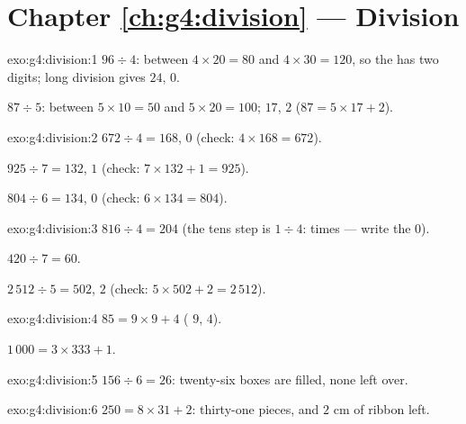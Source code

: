 \section*{Chapter \ref{ch:g4:division} --- Division}

\begin{solution}{exo:g4:division:1}
$96 \div 4$: between $4 \times 20 = 80$ and $4 \times 30 = 120$, so
the  has two digits; long division gives $24$, 
$0$.

$87 \div 5$: between $5 \times 10 = 50$ and $5 \times 20 = 100$;
 $17$,  $2$ ($87 = 5 \times 17 + 2$).
\end{solution}

\begin{solution}{exo:g4:division:2}
$672 \div 4 = 168$,  $0$ (check: $4 \times 168 = 672$).

$925 \div 7 = 132$,  $1$ (check:
$7 \times 132 + 1 = 925$).

$804 \div 6 = 134$,  $0$ (check: $6 \times 134 = 804$).
\end{solution}

\begin{solution}{exo:g4:division:3}
$816 \div 4 = 204$ (the tens step is $1 \div 4$:  times ---
write the $0$).

$420 \div 7 = 60$.

$2\,512 \div 5 = 502$,  $2$ (check:
$5 \times 502 + 2 = 2\,512$).
\end{solution}

\begin{solution}{exo:g4:division:4}
$85 = 9 \times 9 + 4$ ( $9$,  $4$).

$1\,000 = 3 \times 333 + 1$.
\end{solution}

\begin{solution}{exo:g4:division:5}
$156 \div 6 = 26$: twenty-six boxes are filled, none left over.
\end{solution}

\begin{solution}{exo:g4:division:6}
$250 = 8 \times 31 + 2$: thirty-one pieces, and $2$ cm of ribbon
left.
\end{solution}

